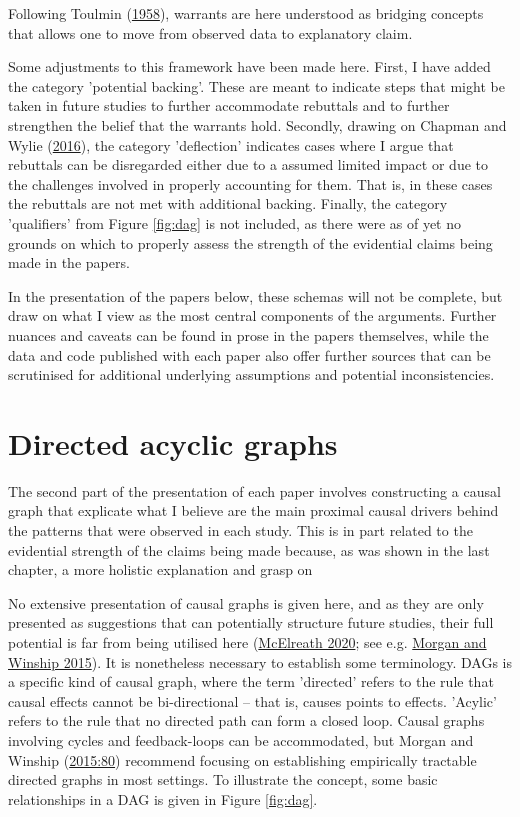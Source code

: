 \documentclass[
  12pt,
  a4paper,
  oneside]{book}
\begin{document}
Following Toulmin (\protect\hyperlink{ref-toulmin1958}{1958}), warrants are here understood as bridging concepts that allows one to move from observed data to explanatory claim.

Some adjustments to this framework have been made here. First, I have added the category 'potential backing'. These are meant to indicate steps that might be taken in future studies to further accommodate rebuttals and to further strengthen the belief that the warrants hold. Secondly, drawing on Chapman and Wylie (\protect\hyperlink{ref-chapman2016}{2016}), the category 'deflection' indicates cases where I argue that rebuttals can be disregarded either due to a assumed limited impact or due to the challenges involved in properly accounting for them. That is, in these cases the rebuttals are not met with additional backing. Finally, the category 'qualifiers' from Figure \ref{fig:dag} is not included, as there were as of yet no grounds on which to properly assess the strength of the evidential claims being made in the papers.

In the presentation of the papers below, these schemas will not be complete, but draw on what I view as the most central components of the arguments. Further nuances and caveats can be found in prose in the papers themselves, while the data and code published with each paper also offer further sources that can be scrutinised for additional underlying assumptions and potential inconsistencies.

\hypertarget{directed-acyclic-graphs}{%
\section{Directed acyclic graphs}\label{directed-acyclic-graphs}}

The second part of the presentation of each paper involves constructing a causal graph that explicate what I believe are the main proximal causal drivers behind the patterns that were observed in each study. This is in part related to the evidential strength of the claims being made because, as was shown in the last chapter, a more holistic explanation and grasp on

No extensive presentation of causal graphs is given here, and as they are only presented as suggestions that can potentially structure future studies, their full potential is far from being utilised here (\protect\hyperlink{ref-mcelreath2020}{McElreath 2020}; see e.g. \protect\hyperlink{ref-morgan2015}{Morgan and Winship 2015}). It is nonetheless necessary to establish some terminology. DAGs is a specific kind of causal graph, where the term 'directed' refers to the rule that causal effects cannot be bi-directional -- that is, causes points to effects. 'Acylic' refers to the rule that no directed path can form a closed loop. Causal graphs involving cycles and feedback-loops can be accommodated, but Morgan and Winship (\protect\hyperlink{ref-morgan2015}{2015:80}) recommend focusing on establishing empirically tractable directed graphs in most settings. To illustrate the concept, some basic relationships in a DAG is given in Figure \ref{fig:dag}.
\end{document}
